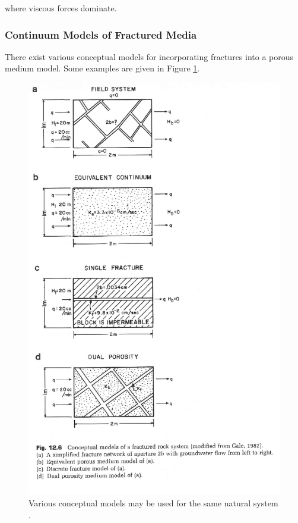 where viscous forces dominate. 





\subsubsection{Continuum Models of Fractured Media} 

There exist various conceptual models for incorporating fractures into a porous  
medium model. Some examples are given in Figure \ref{fig:fractureModels}.

\begin{figure}[htbp!]
  \begin{center}
    \includegraphics{./litrev/fractureModels.eps}
  \end{center}
  \caption{Various conceptual models may be used for the same natural system 
  \cite{anderson_applied_1992}.}
  \label{fig:fractureModels}
\end{figure}


